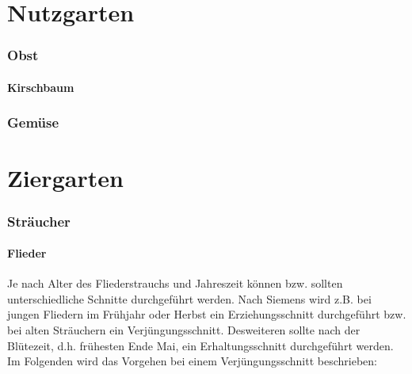 \documentclass[]{article}
\title{}
\author{}
\begin{document}
\maketitle

\begin{abstract}

\end{abstract}

\part{Nutzgarten}

\pagebreak

\section{Obst}

\subsection{Kirschbaum}

\section{Gemüse}

\pagebreak

\part{Ziergarten}

\pagebreak

\section{Sträucher}

\subsection{Flieder}

Je nach Alter des Fliederstrauchs und Jahreszeit können bzw. sollten unterschiedliche Schnitte durchgeführt werden.
Nach Siemens \cite{Siemens2021} wird z.B. bei jungen Fliedern im Frühjahr oder Herbst ein Erziehungsschnitt durchgeführt bzw. bei alten Sträuchern ein Verjüngungsschnitt.
Desweiteren sollte nach der Blütezeit, d.h. frühesten Ende Mai, ein Erhaltungsschnitt durchgeführt werden.
Im Folgenden wird das Vorgehen bei einem Verjüngungsschnitt beschrieben:
\end{document}
